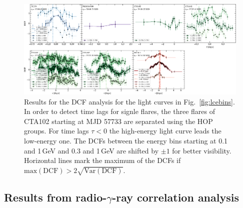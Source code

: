 \documentclass[twocolumn,linenumbers]{aastex62}
\newcommand{\gray}{$\gamma$-ray\xspace}
\begin{document}
\begin{figure}
    \centering
    \includegraphics[width = .9 \linewidth]{figures/zdcf_ebins.pdf}
    \caption{Results for the DCF analysis for the light curves in Fig.~\ref{fig:lcebins}. In order to detect time lags for signle flares, the three flares of CTA102 starting at MJD 57733 are separated using the HOP groups. For time lags $\tau < 0$ the high-energy light curve leads the low-energy one. The DCFs between the energy bins starting at 0.1 and 1\,GeV and 0.3 and 1\,GeV are shifted by $\pm 1$ for better visibility. 
    Horizontal lines mark the maximum of the DCFs if $\mathrm{max}(\mathrm{DCF}) > 2 \sqrt{\mathrm{Var}(\mathrm{DCF})}$.}
    \label{fig:zdcf}
\end{figure}



\subsection{Results from radio-\gray correlation analysis}
\label{sec:gammaradio}
\end{document}
